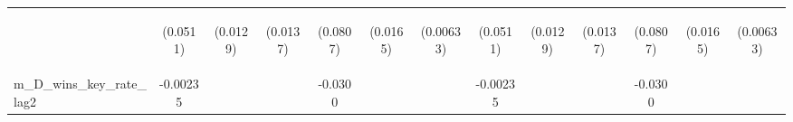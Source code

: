 \documentclass[]{article}
\begin{document}
\begin{center}
\begin{tabular}{lcccccccccccc}
\vspace{4pt} & \begin{footnotesize}(0.0511)\end{footnotesize} & \begin{footnotesize}(0.0129)\end{footnotesize} & \begin{footnotesize}(0.0137)\end{footnotesize} & \begin{footnotesize}(0.0807)\end{footnotesize} & \begin{footnotesize}(0.0165)\end{footnotesize} & \begin{footnotesize}(0.00633)\end{footnotesize} & \begin{footnotesize}(0.0511)\end{footnotesize} & \begin{footnotesize}(0.0129)\end{footnotesize} & \begin{footnotesize}(0.0137)\end{footnotesize} & \begin{footnotesize}(0.0807)\end{footnotesize} & \begin{footnotesize}(0.0165)\end{footnotesize} & \begin{footnotesize}(0.00633)\end{footnotesize} \\
m\_D\_wins\_key\_rate\_lag2 & -0.00235 &  &  & -0.0300 &  &  & -0.00235 &  &  & -0.0300 &  &  \\

\end{tabular}
\end{center}
\end{document}
